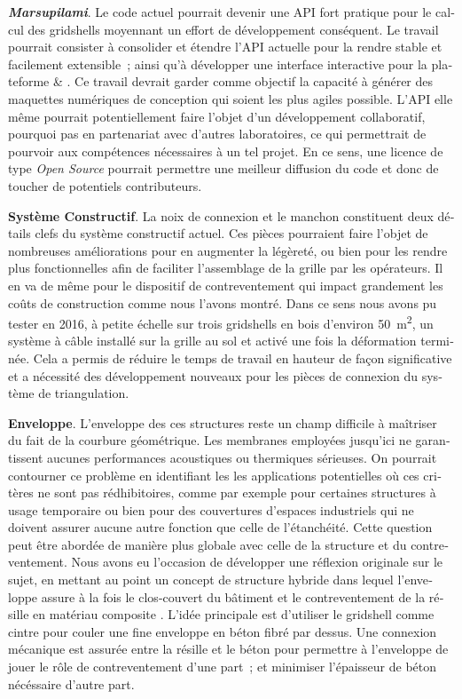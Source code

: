 \begin{otherlanguage}{french}
    \textbf{\emph{Marsupilami}}. Le code actuel pourrait devenir une API \Csharp{} fort pratique pour le calcul des gridshells moyennant un effort de développement conséquent. Le travail pourrait consister à consolider et étendre l'API actuelle pour la rendre stable et facilement extensible~; ainsi qu'à développer une interface interactive pour la plateforme \rhino{} \& \grasshopper{}. Ce travail devrait garder comme objectif la capacité à générer des maquettes numériques de conception qui soient les plus agiles possible. L'API elle même pourrait potentiellement faire l'objet d'un développement collaboratif, pourquoi pas en partenariat avec d'autres laboratoires, ce qui permettrait de pourvoir aux compétences nécessaires à un tel projet. En ce sens, une licence de type \emph{Open Source} pourrait permettre une meilleur diffusion du code et donc de toucher de potentiels contributeurs.
    
    \textbf{Système Constructif}. La noix de connexion et le manchon constituent deux détails clefs du système constructif actuel. Ces pièces pourraient faire l'objet de nombreuses améliorations pour en augmenter la légèreté, ou bien pour les rendre plus fonctionnelles afin de faciliter l'assemblage de la grille par les opérateurs. Il en va de même pour le dispositif de contreventement qui impact grandement les coûts de construction comme nous l'avons montré. Dans ce sens nous avons pu tester en 2016, à petite échelle sur trois gridshells en bois d'environ \SI{50}{m^2}, un système à câble installé sur la grille au sol et activé une fois la déformation terminée. Cela a permis de réduire le temps de travail en hauteur de façon significative et a nécessité des développement nouveaux pour les pièces de connexion du système de triangulation.

    \textbf{Enveloppe}. L'enveloppe des ces structures reste un champ difficile à maîtriser du fait de la courbure géométrique. Les membranes employées jusqu'ici ne garantissent aucunes performances acoustiques ou thermiques sérieuses. On pourrait contourner ce problème en identifiant les les applications potentielles où ces critères ne sont pas rédhibitoires, comme par exemple pour certaines structures à usage temporaire ou bien pour des couvertures d'espaces industriels qui ne doivent assurer aucune autre fonction que celle de l'étanchéité. Cette question peut être abordée de manière plus globale avec celle de la structure et du contreventement. Nous avons eu l'occasion de développer une réflexion originale sur le sujet, en mettant au point un concept de structure hybride dans lequel l'enveloppe assure à la fois le clos-couvert du bâtiment et le contreventement de la résille en matériau composite \cite{Cuvilliers2017}. L'idée principale est d'utiliser le gridshell comme cintre pour couler une fine enveloppe en béton fibré par dessus. Une connexion mécanique est assurée entre la résille et le béton pour permettre à l'enveloppe de jouer le rôle de contreventement d'une part~; et minimiser l'épaisseur de béton nécéssaire d'autre part.


\end{otherlanguage}
